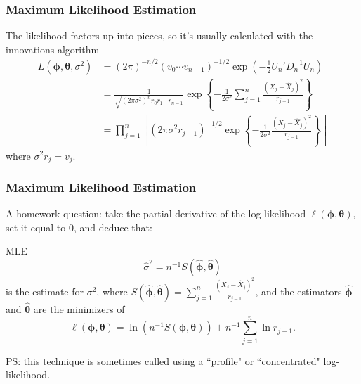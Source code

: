 \documentclass{beamer}
\begin{document}

\begin{frame}
\frametitle{Maximum Likelihood Estimation}

The likelihood factors up into pieces, so it's usually calculated with the innovations algorithm
\begin{align*}
L(\bm{\phi},\bm{\theta}, \sigma^2 ) &= (2\pi)^{-n/2}(v_0\cdots v_{n-1})^{-1/2}\exp\left(-\frac{1}{2}U_n'D_n^{-1}U_n \right)\\
&= \frac{1}{\sqrt{ (2 \pi \sigma^2)^n  r_0 r_1 \cdots r_{n-1}}} \exp\left\{-\frac{1}{2\sigma^2}\sum_{j=1}^n\frac{ (X_j - \hat{X}_j)^2 }{r_{j-1} }  \right\}\\
&= \prod_{j=1}^{n}\left[ (2 \pi \sigma^2 r_{j-1} )^{-1/2} \exp\left\{-\frac{1}{2\sigma^2} \frac{(X_{j} - \hat{X}_j)^2}{r_{j-1} } \right\}\right]
\end{align*}
where $\sigma^2 r_j = v_j$.

\end{frame}


\begin{frame}
\frametitle{Maximum Likelihood Estimation}

A homework question: take the partial derivative of the log-likelihood $\ell(\bm{\phi},\bm{\theta}) $, set it equal to $0$, and deduce that:
\begin{block}{MLE}
\[
\hat{\sigma}^2=  n^{-1}S(\hat{\bm{\phi}},\hat{\bm{\theta}})
\]
is the estimate for $\sigma^2$, where $S(\hat{\bm{\phi}},\hat{\bm{\theta}}) = \sum_{j=1}^n\frac{ (X_j - \hat{X}_j)^2 }{r_{j-1} } $, and the estimators $\hat{\bm{\phi}}$ and $\hat{\bm{\theta}}$ are the minimizers of
\[
\ell(\bm{\phi},\bm{\theta}) = \ln(n^{-1}S(\bm{\phi}, \bm{\theta})) + n^{-1}\sum_{j=1}^n\ln r_{j-1} .
\]

\end{block}
PS: this technique is sometimes called using a ``profile" or ``concentrated" log-likelihood.

\end{frame}

\end{document}
